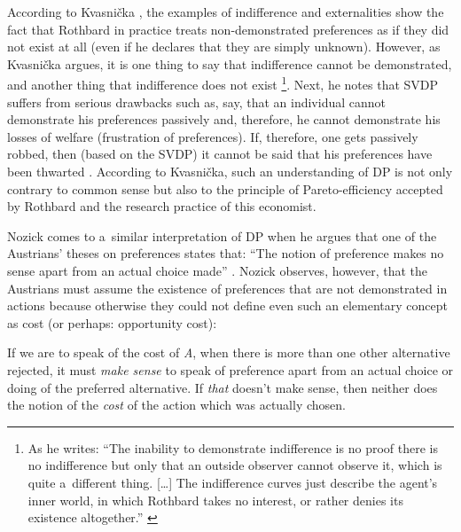 According to Kvasnička 
\parencite*[][]{kvasnicka_rothbards_2008}, %
 the examples of indifference and externalities show the fact that Rothbard in practice treats non-demonstrated preferences as if they did not exist at all (even if he declares that they are simply unknown). However, as Kvasnička argues, it is one thing to say that indifference cannot be demonstrated, and another thing that indifference does not exist 
\parencite[][p.44]{kvasnicka_rothbards_2008}%
\footnote{As he writes: ``The inability to demonstrate indifference is no proof there is no indifference but only that an outside observer cannot observe it, which is quite a~different thing. […] The indifference curves just describe the agent's inner world, in which Rothbard takes no interest, or rather denies its existence altogether.'' 
\parencite[][p.44]{kvasnicka_rothbards_2008}%
}. Next, he notes that SVDP suffers from serious drawbacks such as, say, that an individual cannot demonstrate his preferences passively and, therefore, he cannot demonstrate his losses of welfare (frustration of preferences). If, therefore, one gets passively robbed, then (based on the SVDP) it cannot be said that his preferences have been thwarted 
\parencite[][pp.45–46]{kvasnicka_rothbards_2008}. %
 According to Kvasnička, such an understanding of DP is not only contrary to common sense but also to the principle of Pareto-efficiency accepted by Rothbard and the research practice of this economist.



Nozick comes to a~similar interpretation of DP when he argues that one of the Austrians' theses on preferences states that: ``The notion of preference makes no sense apart from an actual choice made'' 
\parencite[][p.370]{nozick_austrian_1977}. %
 Nozick observes, however, that the Austrians must assume the existence of preferences that are not demonstrated in actions because otherwise they could not define even such an elementary concept as cost (or perhaps: opportunity cost):



If we are to speak of the cost of \textit{A}, when there is more than one other alternative rejected, it must \textit{make sense} to speak of preference apart from an actual choice or doing of the preferred alternative. If \textit{that} doesn't make sense, then neither does the notion of the \textit{cost} of the action which was actually chosen. 
\parencite[][p.373]{nozick_austrian_1977}%





